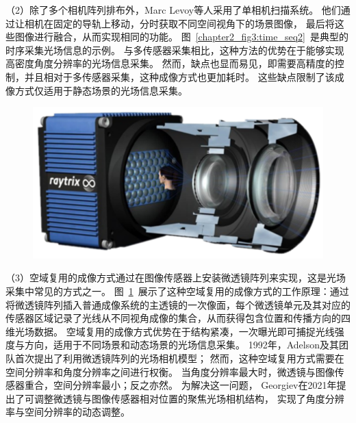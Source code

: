 （2）除了多个相机阵列排布外，Marc Levoy等人采用了单相机扫描系统。
他们通过让相机在固定的导轨上移动，分时获取不同空间视角下的场景图像，
最后将这些图像进行融合，从而实现相同的功能。
图~\ref{chapter2_fig3:time_seq2}~是典型的时序采集光场信息的示例。
与多传感器采集相比，这种方法的优势在于能够实现高密度角度分辨率的光场信息采集。
然而，缺点也显而易见，即需要高精度的控制，并且相对于多传感器采集，这种成像方式也更加耗时。
这些缺点限制了该成像方式仅适用于静态场景的光场信息采集。\par
%
%
%
%
%
\begin{figure}[!ht]
	\centering
	\includegraphics[width=0.65\linewidth]{figures/chapter2/microlens_for_lf_imaging2.drawio}
	\label{chapter2_fig4:microlens_for_lf_imaging}
\end{figure}
（3）空域复用的成像方式通过在图像传感器上安装微透镜阵列来实现，这是光场采集中常见的方式之一。
图~\ref{chapter2_fig4:microlens_for_lf_imaging}~展示了这种空域复用的成像方式的工作原理：通过将微透镜阵列插入普通成像系统的主透镜的一次像面，每个微透镜单元及其对应的传感器区域记录了光线从不同视角成像的集合，从而获得包含位置和传播方向的四维光场数据。
空域复用的成像方式优势在于结构紧凑，一次曝光即可捕捉光线强度与方向，适用于不同场景和动态场景的光场信息采集。
1992年，Adelson及其团队首次提出了利用微透镜阵列的光场相机模型；
然而，这种空域复用方式需要在空间分辨率和角度分辨率之间进行权衡。
当角度分辨率最大时，微透镜与图像传感器重合，空间分辨率最小；反之亦然。
为解决这一问题，
Georgiev在2021年提出了可调整微透镜与图像传感器相对位置的聚焦光场相机结构，
实现了角度分辨率与空间分辨率的动态调整。
%
%
%



